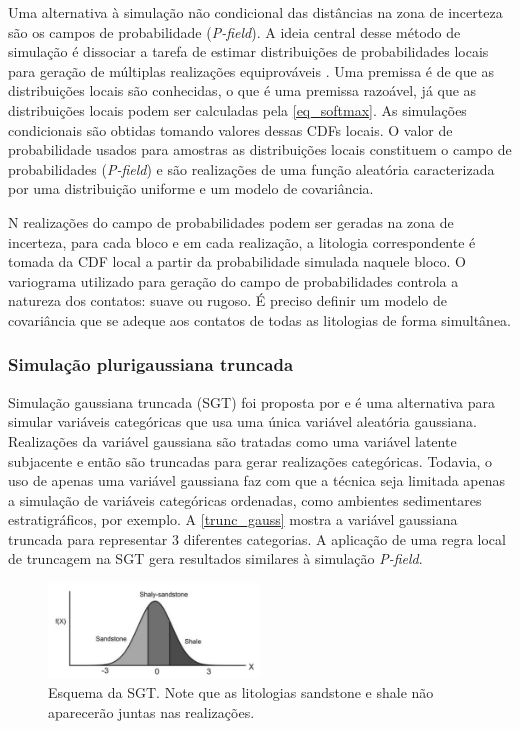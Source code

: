 Uma alternativa à simulação não condicional das distâncias na zona de incerteza são os campos de probabilidade (\textit{P-field}). A ideia central desse método de simulação é dissociar a tarefa de estimar distribuições de probabilidades locais para geração de múltiplas realizações equiprováveis \cite{froidevaux1993probability}. Uma premissa é de que as distribuições locais são conhecidas, o que é uma premissa razoável, já que as distribuições locais podem ser calculadas pela \autoref{eq_softmax}. As simulações condicionais são obtidas tomando valores dessas CDFs locais. O valor de probabilidade usados para amostras as distribuições locais constituem o campo de probabilidades (\textit{P-field}) e são realizações de uma função aleatória caracterizada por uma distribuição uniforme e um modelo de covariância.

N realizações do campo de probabilidades podem ser geradas na zona de incerteza, para cada bloco e em cada realização, a litologia correspondente é tomada da CDF local a partir da probabilidade simulada naquele bloco. O variograma utilizado para geração do campo de probabilidades controla a natureza dos contatos: suave ou rugoso. É preciso definir um modelo de covariância que se adeque aos contatos de todas as litologias de forma simultânea.

\subsubsection{Simulação plurigaussiana truncada}

Simulação gaussiana truncada (SGT) foi proposta por  e é uma alternativa para simular variáveis categóricas que usa uma única variável aleatória gaussiana. Realizações da variável gaussiana são tratadas como uma variável latente subjacente \cite{hier_plurigauss} e então são truncadas para gerar realizações categóricas. Todavia, o uso de apenas uma variável gaussiana faz com que a técnica seja limitada apenas a simulação de variáveis categóricas ordenadas, como ambientes sedimentares estratigráficos, por exemplo. A \autoref{trunc_gauss} mostra a variável gaussiana truncada para representar 3 diferentes categorias. A aplicação de uma regra local de truncagem na SGT gera resultados similares à simulação \textit{P-field}.

\begin{figure}[H]
	\caption{\label{trunc_gauss}Esquema da SGT. Note que as litologias sandstone e shale não aparecerão juntas nas realizações.}
	\begin{center}
		\includegraphics[width=0.5\textwidth]{capitulo_3/gauss_trunc_sketch.png}
	\end{center}
\end{figure}

